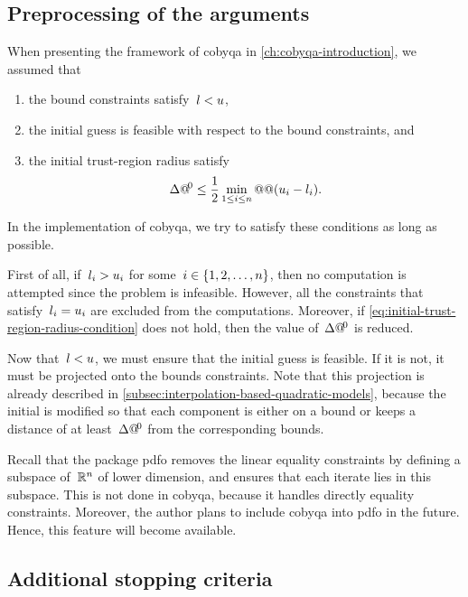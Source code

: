 \subsection{Preprocessing of the arguments}

When presenting the framework of \gls{cobyqa} in \cref{ch:cobyqa-introduction}, we assumed that
\begin{enumerate}
    \item the bound constraints satisfy~$l < u$,
    \item the initial guess is feasible with respect to the bound constraints, and
    \item the initial trust-region radius satisfy
    \begin{equation}
        \label{eq:initial-trust-region-radius-condition}
        \rad[0] \le \frac{1}{2} \min_{1 \le i \le n} @@ (\xu_i - \xl_i).
    \end{equation}
\end{enumerate}
In the implementation of \gls{cobyqa}, we try to satisfy these conditions as long as possible.

First of all, if~$l_i > u_i$ for some~$i \in \{1, 2, \dots, n\}$, then no computation is attempted since the problem is infeasible.
However, all the constraints that satisfy~$l_i = u_i$ are excluded from the computations.
Moreover, if \cref{eq:initial-trust-region-radius-condition} does not hold, then the value of~$\rad[0]$ is reduced.

Now that~$l < u$, we must ensure that the initial guess is feasible.
If it is not, it must be projected onto the bounds constraints.
Note that this projection is already described in \cref{subsec:interpolation-based-quadratic-models}, because the initial is modified so that each component is either on a bound or keeps a distance of at least~$\rad[0]$ from the corresponding bounds.

Recall that the package \gls{pdfo} removes the linear equality constraints by defining a subspace of~$\mathbb{R}^n$ of lower dimension, and ensures that each iterate lies in this subspace.
This is not done in \gls{cobyqa}, because it handles directly equality constraints.
Moreover, the author plans to include \gls{cobyqa} into \gls{pdfo} in the future.
Hence, this feature will become available.

\subsection{Additional stopping criteria}

